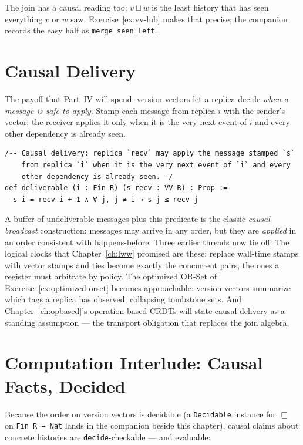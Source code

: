 \documentclass[12pt, a4paper, openright]{book}
\theoremstyle{thmstyle}
\theoremstyle{defstyle}
\newcommand{\lc}[1]{\texttt{#1}}
\begin{document}
The join has a causal reading too: $v \sqcup w$ is the least history
that has seen everything $v$ or $w$ saw. Exercise~\ref{ex:vv-lub} makes
that precise; the companion records the easy half as
\lc{merge_seen_left}.

\section{Causal Delivery}

The payoff that Part~IV will spend: version vectors let a replica decide
\emph{when a message is safe to apply}. Stamp each message from replica
$i$ with the sender's vector; the receiver applies it only when it is
the very next event of $i$ and every other dependency is already seen.

\begin{verbatim}
/-- Causal delivery: replica `recv` may apply the message stamped `s`
    from replica `i` when it is the very next event of `i` and every
    other dependency is already seen. -/
def deliverable (i : Fin R) (s recv : VV R) : Prop :=
  s i = recv i + 1 ∧ ∀ j, j ≠ i → s j ≤ recv j
\end{verbatim}

A buffer of undeliverable messages plus this predicate is the classic
\emph{causal broadcast} construction: messages may arrive in any order,
but they are \emph{applied} in an order consistent with happens-before.
Three earlier threads now tie off. The logical clocks that
Chapter~\ref{ch:lww} promised are these: replace wall-time stamps with
vector stamps and ties become exactly the concurrent pairs, the ones a
register must arbitrate by policy. The optimized OR-Set of
Exercise~\ref{ex:optimized-orset} becomes approachable: version vectors
summarize which tags a replica has observed, collapsing tombstone sets.
And Chapter~\ref{ch:opbased}'s operation-based CRDTs will state causal
delivery as a standing assumption --- the transport obligation that
replaces the join algebra.

\section{Computation Interlude: Causal Facts, Decided}

Because the order on version vectors is decidable (a \lc{Decidable}
instance for $\sqsubseteq$ on \lc{Fin R → Nat} lands in the companion
beside this chapter), causal claims about concrete histories are
\lc{decide}-checkable --- and evaluable:
\end{document}
